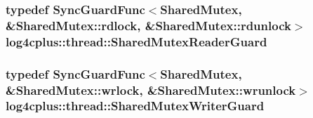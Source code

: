 \hypertarget{namespacelog4cplus_1_1thread_a8bd093553b9a56ba1e032ebf07265da0}{
\subsubsection[{Shared\-Mutex\-Reader\-Guard}]{\setlength{\rightskip}{0pt plus 5cm}typedef {\bf Sync\-Guard\-Func}$<${\bf Shared\-Mutex}, \&{\bf Shared\-Mutex\-::rdlock}, \&{\bf Shared\-Mutex\-::rdunlock}$>$ {\bf log4cplus\-::thread\-::\-Shared\-Mutex\-Reader\-Guard}}}\label{namespacelog4cplus_1_1thread_a8bd093553b9a56ba1e032ebf07265da0}
\hypertarget{namespacelog4cplus_1_1thread_adf498119742efc3efc3df947998f36d5}{
\subsubsection[{Shared\-Mutex\-Writer\-Guard}]{\setlength{\rightskip}{0pt plus 5cm}typedef {\bf Sync\-Guard\-Func}$<${\bf Shared\-Mutex}, \&{\bf Shared\-Mutex\-::wrlock}, \&{\bf Shared\-Mutex\-::wrunlock}$>$ {\bf log4cplus\-::thread\-::\-Shared\-Mutex\-Writer\-Guard}}}\label{namespacelog4cplus_1_1thread_adf498119742efc3efc3df947998f36d5}



